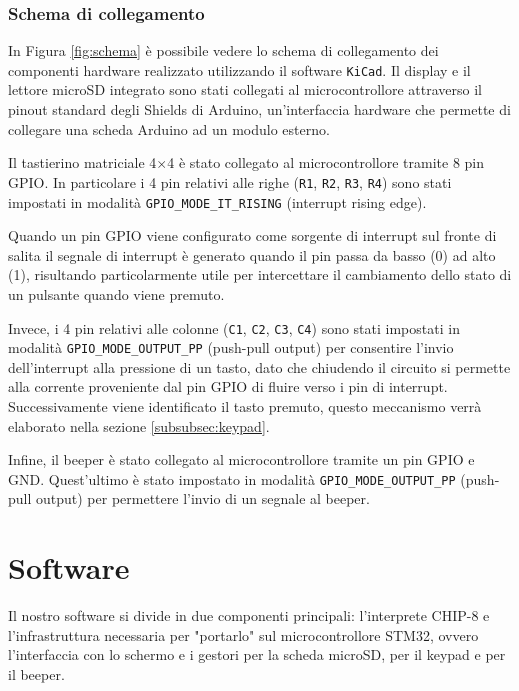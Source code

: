 \documentclass[a4paper]{article}
\begin{document}
\subsubsection{Schema di collegamento}\label{subsubsec:collegamenti}

In Figura \ref{fig:schema} è possibile vedere lo schema di collegamento
dei componenti hardware realizzato utilizzando il software \texttt{KiCad}.
Il display e il lettore microSD integrato sono stati collegati al microcontrollore
attraverso il pinout standard degli Shields di Arduino, un'interfaccia hardware che permette
di collegare una scheda Arduino ad un modulo esterno.

Il tastierino matriciale 4$\times$4 è stato collegato al microcontrollore tramite 8 pin GPIO.
In particolare i 4 pin relativi alle righe (\texttt{R1}, \texttt{R2}, \texttt{R3}, \texttt{R4})
sono stati impostati in modalità \texttt{GPIO\_MODE\_IT\_RISING} (interrupt rising edge).

Quando un pin GPIO viene configurato come sorgente di interrupt sul fronte di salita
il segnale di interrupt è generato quando il pin passa da basso (0) ad alto (1), risultando
particolarmente utile per intercettare il cambiamento dello stato di un
pulsante quando viene premuto.

Invece, i 4 pin relativi alle colonne (\texttt{C1}, \texttt{C2}, \texttt{C3}, \texttt{C4})
sono stati impostati in modalità \texttt{GPIO\_MODE\_OUTPUT\_PP} (push-pull output) per
consentire l'invio dell'interrupt alla pressione di un tasto, dato che chiudendo il circuito
si permette alla corrente proveniente dal pin GPIO di fluire verso i pin di interrupt.
Successivamente viene identificato il tasto premuto, questo meccanismo verrà elaborato
nella sezione \ref{subsubsec:keypad}.

Infine, il beeper è stato collegato al microcontrollore tramite un pin GPIO e GND.
Quest'ultimo è stato impostato in modalità \texttt{GPIO\_MODE\_OUTPUT\_PP} (push-pull output)
per permettere l'invio di un segnale al beeper.

\section{Software}

Il nostro software si divide in due componenti principali: l'interprete CHIP-8 e
l'infrastruttura necessaria per "portarlo" sul microcontrollore STM32, ovvero l'interfaccia
con lo schermo e i gestori per la scheda microSD, per il keypad e per il beeper.
\end{document}
